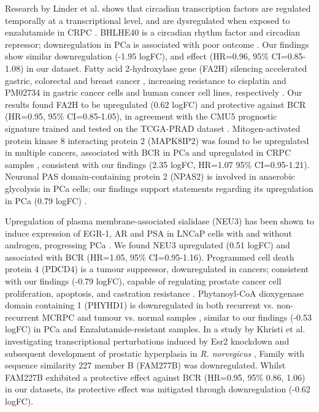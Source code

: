 Research by Linder et al. shows that circadian transcription factors are regulated temporally at a transcriptional level, and are dysregulated when exposed to enzalutamide in CRPC \cite{Linder2022Jun}. BHLHE40 is a circadian rhythm factor and circadian repressor; downregulation in PCa is associated with poor outcome \cite{HeidariHorestani2024Dec}. Our findings show similar downregulation (-1.95 logFC), and effect (HR=0.96, 95\% CI=0.85-1.08) in our dataset. Fatty acid 2-hydroxylase gene (FA2H) silencing accelerated gastric, colorectal and breast cancer \cite{Yao2019Mar, LiangSun2021Jan, Dai2019Oct}, increasing resistance to cisplatin and PM02734 in gastric cancer cells and human cancer cell lines, respectively \cite{Yao2019Mar, Herrero2008Dec}. Our results found FA2H to be upregulated (0.62 logFC) and protective against BCR (HR=0.95, 95\% CI=0.85-1.05), in agreement with the CMU5 prognostic signature trained and tested on the TCGA-PRAD dataset \cite{Wang2020May}. Mitogen-activated protein kinase 8 interacting protein 2 (MAPK8IP2) was found to be upregulated in multiple cancers, associated with BCR in PCa and upregulated in CRPC samples \cite{Zeng2022Nov, Cheng2020Jun}, consistent with our findings (2.35 logFC, HR=1.07 95\% CI=0.95-1.21). Neuronal PAS domain-containing protein 2 (NPAS2) is involved in anaerobic glycolysis in PCa cells; our findings support statements regarding its upregulation in PCa (0.79 logFC) \cite{Ma2023Dec}. 

\par

Upregulation of plasma membrane-associated sialidase (NEU3) has been shown to induce expression of EGR-1, AR and PSA in LNCaP cells with and without androgen, progressing PCa \cite{Kawamura2012Jan}. We found NEU3 upregulated (0.51 logFC) and associated with BCR (HR=1.05, 95\% CI=0.95-1.16). Programmed cell death protein 4 (PDCD4) is a tumour suppressor, downregulated in cancers; consistent with our findings (-0.79 logFC), capable of regulating prostate cancer cell proliferation, apoptosis, and castration resistance \cite{Zennami2019Feb}.  Phytanoyl-CoA dioxygenase domain containing 1 (PHYHD1) is downregulated in both recurrent vs. non-recurrent MCRPC and tumour vs. normal samples \cite{Li2018Feb, Su2021Sep}, similar to our findings (-0.53 logFC) in PCa and Enzalutamide-resistant samples. In a study by Khristi et al. investigating transcriptional perturbations induced by Esr2 knockdown and subsequent development of prostatic hyperplasia in \textit{R. norvegicus} \cite{Khristi2019Mar}, Family with sequence similarity 227 member B (FAM277B) was downregulated. Whilst FAM227B exhibited a protective effect against BCR (HR=0.95, 95\% 0.86, 1.06) in our datasets, its protective effect was mitigated through downregulation (-0.62 logFC). 


